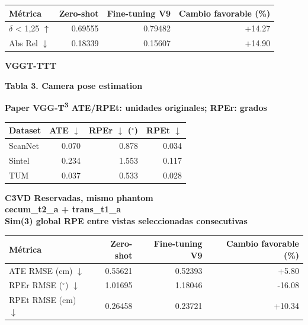 \documentclass[10pt,a4paper]{article}
\begin{document}
\vspace{2mm}
\begingroup\small
\begin{tabularx}{\textwidth}{@{}LRRR@{}}
\toprule
\textbf{Métrica} & \textbf{Zero-shot} & \textbf{Fine-tuning V9} & \textbf{Cambio favorable (\%)} \\
\midrule
\(\delta\) < 1,25 \(\uparrow\) & 0.69555 & 0.79482 & +14.27 \\
Abs Rel \(\downarrow\) & 0.18339 & 0.15607 & +14.90 \\
\bottomrule
\end{tabularx}
\endgroup
\vspace{6mm}
\clearpage
{\Large\bfseries\color{header} VGGT-TTT}\par
\vspace{5mm}
{\large\bfseries Tabla 3. Camera pose estimation}\par
\vspace{4mm}
{\small\bfseries Paper \textperiodcentered{} VGG-T\textsuperscript{3} \textperiodcentered{} ATE/RPEt: unidades originales; RPEr: grados}\par
\vspace{2mm}
\begingroup\small
\begin{tabularx}{\textwidth}{@{}LRRR@{}}
\toprule
\textbf{Dataset} & \textbf{ATE \(\downarrow\)} & \textbf{RPEr \(\downarrow\) (\(^{\circ}\))} & \textbf{RPEt \(\downarrow\)} \\
\midrule
ScanNet & 0.070 & 0.878 & 0.034 \\
Sintel & 0.234 & 1.553 & 0.117 \\
TUM & 0.037 & 0.533 & 0.028 \\
\bottomrule
\end{tabularx}
\endgroup
\vspace{6mm}
{\small\bfseries C3VD \textperiodcentered{} Reservadas, mismo phantom\\cecum\_t2\_a + trans\_t1\_a\\Sim(3) global \textperiodcentered{} RPE entre vistas seleccionadas consecutivas}\par
\vspace{2mm}
\begingroup\small
\begin{tabularx}{\textwidth}{@{}LRRR@{}}
\toprule
\textbf{Métrica} & \textbf{Zero-shot} & \textbf{Fine-tuning V9} & \textbf{Cambio favorable (\%)} \\
\midrule
ATE \textperiodcentered{} RMSE (cm) \(\downarrow\) & 0.55621 & 0.52393 & +5.80 \\
RPEr \textperiodcentered{} RMSE (\(^{\circ}\)) \(\downarrow\) & 1.01695 & 1.18046 & -16.08 \\
RPEt \textperiodcentered{} RMSE (cm) \(\downarrow\) & 0.26458 & 0.23721 & +10.34 \\
\bottomrule
\end{tabularx}
\end{document}
